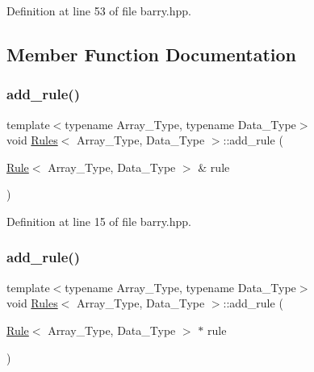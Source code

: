 Definition at line 53 of file barry.\+hpp.



\subsection{Member Function Documentation}
\mbox{\label{classbarry_1_1_rules_a60583152fddcb11178dcf3d02a924d7c}} 
\subsubsection{\texorpdfstring{add\+\_\+rule()}{add\_rule()}\hspace{0.1cm}{\footnotesize\ttfamily [1/3]}}
{\footnotesize\ttfamily template$<$typename Array\+\_\+\+Type, typename Data\+\_\+\+Type$>$ \\
void \hyperlink{classbarry_1_1_rules}{Rules}$<$ Array\+\_\+\+Type, Data\+\_\+\+Type $>$\+::add\+\_\+rule (\begin{DoxyParamCaption}\item[{\hyperlink{classbarry_1_1_rule}{Rule}$<$ Array\+\_\+\+Type, Data\+\_\+\+Type $>$ \&}]{rule }\end{DoxyParamCaption})\hspace{0.3cm}{\ttfamily [inline]}}



Definition at line 15 of file barry.\+hpp.

\mbox{\label{classbarry_1_1_rules_abd60b1d381ad0c8a772e4d81264bbe0a}} 
\subsubsection{\texorpdfstring{add\+\_\+rule()}{add\_rule()}\hspace{0.1cm}{\footnotesize\ttfamily [2/3]}}
{\footnotesize\ttfamily template$<$typename Array\+\_\+\+Type, typename Data\+\_\+\+Type$>$ \\
void \hyperlink{classbarry_1_1_rules}{Rules}$<$ Array\+\_\+\+Type, Data\+\_\+\+Type $>$\+::add\+\_\+rule (\begin{DoxyParamCaption}\item[{\hyperlink{classbarry_1_1_rule}{Rule}$<$ Array\+\_\+\+Type, Data\+\_\+\+Type $>$ $\ast$}]{rule }\end{DoxyParamCaption})\hspace{0.3cm}{\ttfamily [inline]}}



